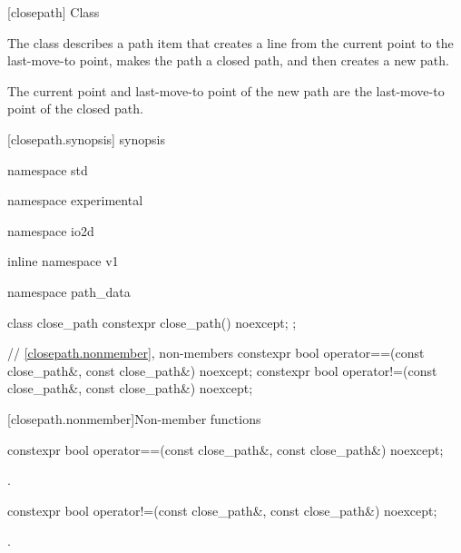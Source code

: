  [closepath] {Class }%

\pnum
{}
The class  describes a path item that creates a line from the current point to the last-move-to point, makes the path a closed path, and then creates a new path.

\pnum
The current point and last-move-to point of the new path are the last-move-to point of the closed path.

 [closepath.synopsis] { synopsis}%

\begin{codeblock}
namespace std { namespace experimental { namespace io2d { inline namespace v1 {
  namespace path_data {
    class close_path {
      constexpr close_path() noexcept;
    };
    
    // \ref{closepath.nonmember}, non-members
    constexpr bool operator==(const close_path&, const close_path&) noexcept;
    constexpr bool operator!=(const close_path&, const close_path&) noexcept;
  }
} } } }
\end{codeblock}

 [closepath.nonmember]{Non-member functions}%

%
\begin{itemdecl}
constexpr bool operator==(const close_path&, const close_path&) noexcept;
\end{itemdecl}
\begin{itemdescr}
\pnum
\returns
{}.
\end{itemdescr}

%
\begin{itemdecl}
constexpr bool operator!=(const close_path&, const close_path&) noexcept;
\end{itemdecl}
\begin{itemdescr}
\pnum
\returns
{}.
\end{itemdescr}
